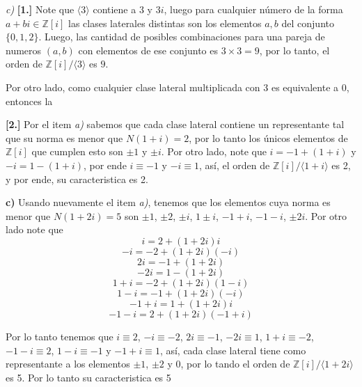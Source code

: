     \textit{c)} \textbf{[1.]} Note que $\langle 3 \rangle$ contiene a $3$ y $3i$, luego para cualquier número de la forma $a +bi \in \mathbb{Z}[i]$ las clases laterales distintas son los elementos $a,b$ del conjunto $\{0, 1, 2\}$. Luego, las cantidad de posibles combinaciones para una pareja de numeros $(a,b)$ con elementos de ese conjunto es $3 \times 3= 9$, por lo tanto, el orden de $\mathbb{Z}[i]/\langle 3 \rangle$ es $9$.

    Por otro lado, como cualquier clase lateral multiplicada con 3 es equivalente a 0, entonces la 

    \textbf{[2.]} Por el item \textit{a)} sabemos que cada clase lateral contiene un representante tal que su norma es menor que $N(1 + i) = 2$, por lo tanto los únicos elementos de $\mathbb{Z}[i]$ que cumplen esto son $\pm1$ y $\pm i$. Por otro lado, note que $i = -1 + (1+i)$ y $-i = 1 -(1 + i)$, por ende $i \equiv-1$ y $-i \equiv 1$, así, el orden de $\mathbb{Z}[i]/\langle 1 + i \rangle$ es 2, y por ende, su caracteristica es 2.

    \textbf{c)} Usando nuevamente el item \textit{a)}, tenemos que los elementos cuya norma es menor que $N(1 +2i) = 5$ son $\pm 1$, $\pm2$, $\pm i$, $1\pm i$, $-1+i$, $-1-i$, $\pm2i$. Por otro lado note que
    $$i = 2+ (1+2i)i$$
    $$-i = -2+(1+2i)(-i)$$
    $$2i = -1 +(1+2i)$$
    $$-2i = 1 - (1+2i)$$
    $$1 + i = -2 + (1+2i)(1-i)$$
    $$1-i = -1 +(1+2i)(-i)$$
    $$-1+i = 1 + (1+2i)i$$
    $$-1-i = 2 + (1+2i)(-1+i)$$

    Por lo tanto tenemos que $i \equiv2$, $-i \equiv-2$, $2i \equiv -1$, $-2i \equiv 1$, $1+i \equiv -2$, $-1-i \equiv 2$, $1-i \equiv -1$ y $-1+i\equiv 1$, así, cada clase lateral tiene como representante a los elementos $\pm 1$, $\pm 2$ y $0$, por lo tando el orden de $\mathbb{Z}[i]/\langle 1 + 2i \rangle$ es 5. Por lo tanto su caracteristica es 5 

